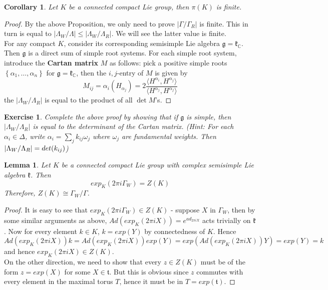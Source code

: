 \documentclass[11pt]{article}
\newtheorem{corollary}[theorem]{Corollary}
\newtheorem{lemma}[theorem]{Lemma}
\newtheorem{exercise}[theorem]{Exercise}
\newcommand{\bb}[1]{\mathbb{#1}}
\newcommand{\mf}[1]{\mathfrak{#1}}
\begin{document}
\begin{corollary}
Let $K$ be a connected compact Lie group, then $\pi(K)$ is finite.
\end{corollary}
\begin{proof}
By the above Proposition, we only need to prove $|\Gamma/\Gamma_R|$ is finite. This in turn is equal to $|\Lambda_W/\Lambda| \leq |\Lambda_W/\Lambda_R|$. We will see the latter value is finite.\\
For any compact $K$, consider its corresponding semisimple Lie algebra $\mf{g} = \mf{k}_{\bb{C}}$. Then $\mf{g}$ is a direct sum of simple root systems. For each simple root system, introduce the \textbf{Cartan matrix} $M$ as follows: pick a positive simple roots $\left\{\alpha_1,\dots,\alpha_n\right\}$ for $\mf{g} = \mf{k}_{\bb{C}}$, then the $i,j$-entry of $M$ is given by
$$ M_{ij} = \alpha_i(H_{\alpha_j}) = 2 \frac{ \langle H^{\alpha_i}, H^{\alpha_j} \rangle}{\langle H^{\alpha_j}, H^{\alpha_j} \rangle}$$
the $|\Lambda_W/\Lambda_R|$ is equal to the product of all $\det M$'s.
\end{proof}
\begin{exercise}
Complete the above proof by showing that if $\mf{g}$ is simple, then $|\Lambda_W/\Lambda_R|$ is equal to the determinant of the Cartan matrix.
(Hint: For each $\alpha_i \in \Delta$, write $\alpha_i = \sum_j k_{ij}\omega_j$ where $\omega_j$ are fundamental weights. Then $|\Lambda_W/\Lambda_R| = \\det(k_{ij})$)
\end{exercise}


\begin{lemma}
Let $K$ be a connected compact Lie group with complex semisimple Lie algebra $\mf{k}$. Then
$$exp_K(2\pi i \Gamma_W) = Z(K)$$
Therefore, $Z(K) \cong \Gamma_W/\Gamma$.
\end{lemma}
\begin{proof}
It is easy to see that $exp_K(2 \pi i \Gamma_W) \in Z(K)$ - suppose $X$ in $\Gamma_W$, then by some similar arguments as above, $Ad(exp_K(2 \pi i X)) = e^{ad_{2\pi i X}}$ acts trivially on $\mf{k}$. Now for every element $k \in K$, $k = exp(Y)$ by connectedness of $K$. Hence
$$Ad(exp_K(2\pi i X))k = Ad(exp_K(2\pi i X))exp(Y) =  exp(Ad(exp_K(2 \pi i X))Y) = exp(Y) = k$$
and hence $exp_K(2 \pi iX) \in Z(K)$.\\
On the other direction, we need to show that every $z \in Z(K)$ must be of the form $z = exp(X)$ for some $X \in \mf{t}$. But this is obvious since $z$ commutes with every element in the maximal torus $T$, hence it must be in $T = exp(\mf{t})$.
\end{proof}
\end{document}
